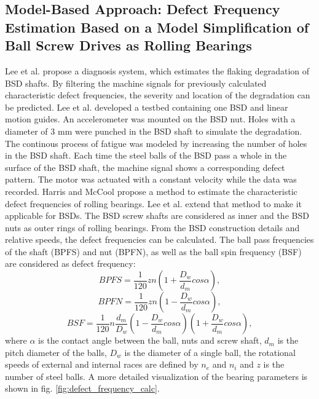 \subsection{Model-Based Approach: Defect Frequency Estimation Based on a Model Simplification of Ball Screw Drives as Rolling Bearings}
Lee et al. \cite{Lee2015} propose a diagnosis system, which estimates the flaking degradation of BSD shafts. By filtering the machine signals for previously calculated characteristic defect frequencies, the severity and location of the degradation can be predicted. Lee et al. developed a testbed containing one BSD and linear motion guides. An accelerometer was mounted on the BSD nut. Holes with a diameter of 3 mm were punched in the BSD shaft to simulate the degradation. The continous process of fatigue was modeled by increasing the number of holes in the BSD shaft. Each time the steel balls of the BSD pass a whole in the surface of the BSD shaft, the machine signal shows a corresponding defect pattern. The motor was actuated with a constant velocity while the data was recorded. Harris and McCool \cite{Harris1996} propose a method to estimate the characteristic defect frequencies of rolling bearings. Lee et al. \cite{Lee2015} extend that method to make it applicable for BSDs. The BSD screw shafts are considered as inner and the BSD nuts as outer rings of rolling bearings. From the BSD construction details and relative speeds, the defect frequencies can be calculated. The ball pass frequencies of the shaft (BPFS) and nut (BPFN), as well as the ball spin frequency (BSF) are considered as defect frequency: 
\begin{equation}
    BPFS = \frac{1}{120}zn(1+\frac{D_{w}}{d_{m}}cos\alpha),
    \label{eq:defect_frequency}
\end{equation}
\begin{equation}
    BPFN = \frac{1}{120}zn(1-\frac{D_{w}}{d_{m}}cos\alpha),
\end{equation}
\begin{equation}
    BSF = \frac{1}{120}n\frac{d_{m}}{D_{w}} (1-\frac{D_{w}}{d_{m}}cos\alpha)(1+\frac{D_{w}}{d_{m}}cos\alpha) ,
\end{equation}
where $\alpha$ is the contact angle between the ball, nuts and screw shaft, $d_{m}$ is the pitch diameter of the balls, $D_{w}$ is the diameter of a single ball, the rotational speeds of external and internal races are defined by $n_{e}$ and $n_{i}$ and $z$ is the number of steel balls. A more detailed visualization of the bearing parameters is shown in fig. \ref{fig:defect_frequency_calc}. 

